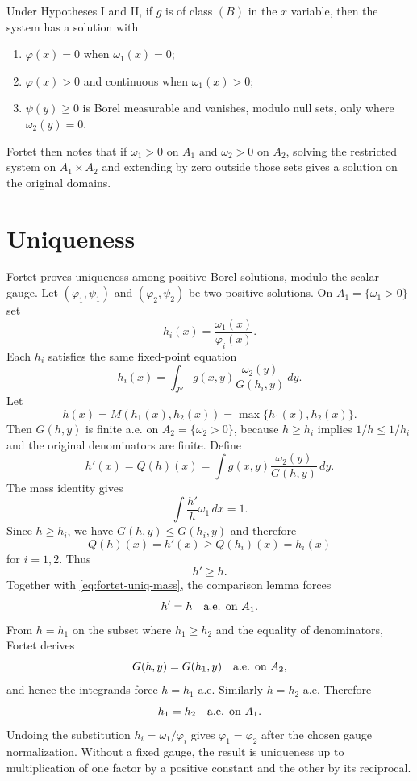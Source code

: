\begin{theorem}
Under Hypotheses I and II, if $g$ is of class $(B)$ in the $x$ variable, then
the system has a solution with
\begin{enumerate}[leftmargin=2em]
\item $\varphi(x)=0$ when $\omega_1(x)=0$;
\item $\varphi(x)>0$ and continuous when $\omega_1(x)>0$;
\item $\psi(y)\ge0$ is Borel measurable and vanishes, modulo null sets, only where $\omega_2(y)=0$.
\end{enumerate}
\end{theorem}

Fortet then notes that if $\omega_1>0$ on $A_1$ and $\omega_2>0$ on $A_2$, solving the restricted system on $A_1\times A_2$ and extending by zero outside those sets gives a solution on the original domains.

\section{Uniqueness}
Fortet proves uniqueness among positive Borel solutions, modulo the scalar gauge.
Let $(\varphi_1,\psi_1)$ and $(\varphi_2,\psi_2)$ be two positive solutions.  On $A_1=\{\omega_1>0\}$ set
\[
  h_i(x)=\frac{\omega_1(x)}{\varphi_i(x)}.
\]
Each $h_i$ satisfies the same fixed-point equation
\[
  h_i(x)=\int_{J''}g(x,y)
  \frac{\omega_2(y)}{G(h_i,y)}\,dy.
\]
Let
\[
  h(x)=M(h_1(x),h_2(x))=\max\{h_1(x),h_2(x)\}.
\]
Then $G(h,y)$ is finite a.e. on $A_2=\{\omega_2>0\}$, because $h\ge h_i$ implies $1/h\le1/h_i$ and the original denominators are finite.  Define
\[
  h'(x)=Q(h)(x)=\int g(x,y)\frac{\omega_2(y)}{G(h,y)}\,dy.
\]
The mass identity gives
\[
  \int\frac{h'}{h}\omega_1\,dx=1. \tag{U1}\label{eq:fortet-uniq-mass}
\]
Since $h\ge h_i$, we have $G(h,y)\le G(h_i,y)$ and therefore
\[
  Q(h)(x)=h'(x)\ge Q(h_i)(x)=h_i(x)
\]
for $i=1,2$.  Thus
\[
  h'\ge h.
\]
Together with \eqref{eq:fortet-uniq-mass}, the comparison lemma forces
\[
  h'=h \quad\hbox{a.e. on }A_1.
\]
From $h=h_1$ on the subset where $h_1\ge h_2$ and the equality of denominators, Fortet derives
\[
  G(h,y)=G(h_1,y)\quad\hbox{a.e. on }A_2,
\]
and hence the integrands force $h=h_1$ a.e.  Similarly $h=h_2$ a.e.  Therefore
\[
  h_1=h_2\quad\hbox{a.e. on }A_1.
\]
Undoing the substitution $h_i=\omega_1/\varphi_i$ gives $\varphi_1=\varphi_2$ after the chosen gauge normalization.  Without a fixed gauge, the result is uniqueness up to multiplication of one factor by a positive constant and the other by its reciprocal.

